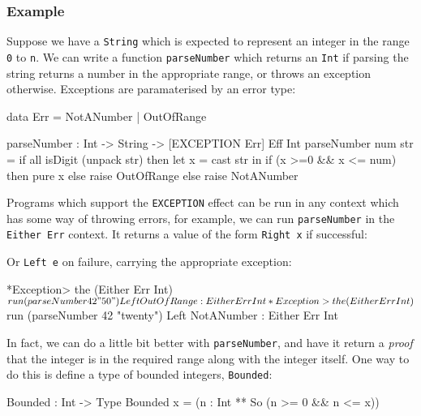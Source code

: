 \subsubsection*{Example}

Suppose we have a \texttt{String} which is expected to represent an integer in
the range \texttt{0} to \texttt{n}. We can write a function \texttt{parseNumber}
which returns an \texttt{Int} if parsing the string returns a number in the
appropriate range, or throws an exception otherwise. Exceptions are
paramaterised by an error type:

\begin{code}
data Err = NotANumber | OutOfRange

parseNumber : Int -> String -> { [EXCEPTION Err] } Eff Int
parseNumber num str
   = if all isDigit (unpack str)
        then let x = cast str in
             if (x >=0 && x <= num)
                then pure x
                else raise OutOfRange
        else raise NotANumber
\end{code}

\noindent
Programs which support the \texttt{EXCEPTION} effect can be run in any
context which has some way of throwing errors, for example, we can run
\texttt{parseNumber} in the \texttt{Either Err} context. It returns
a value of the form \texttt{Right x} if successful:


\noindent
Or \texttt{Left e} on failure, carrying the appropriate exception:

\begin{code}
*Exception> the (Either Err Int) $ run (parseNumber 42 "50")
Left OutOfRange : Either Err Int

*Exception> the (Either Err Int) $ run (parseNumber 42 "twenty")
Left NotANumber : Either Err Int
\end{code}

\noindent
In fact, we can do a little bit better with \texttt{parseNumber}, and have it
return a \emph{proof} that the integer is in the required range along with
the integer itself. One way to do this is define a type of bounded integers,
\texttt{Bounded}:

\begin{code}
Bounded : Int -> Type
Bounded x = (n : Int ** So (n >= 0 && n <= x))
\end{code}

